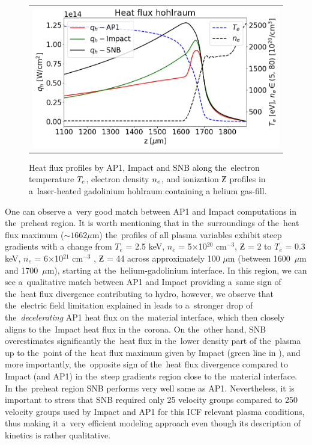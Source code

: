 \begin{figure}[htb]
  \begin{center}
    \begin{tabular}{c}
      \includegraphics[width=\figscale\textwidth]{../VFPdata/C7_GdHohlraum_heatflux.png}
    \end{tabular}
  \caption{
  Heat flux profiles by AP1, Impact and SNB along 
  the~electron temperature $T_e$, electron density $n_e$, 
  and ionization $\Zbar$ profiles in a~laser-heated gadolinium hohlraum 
  containing a helium gas-fill.
  }
  \label{fig:Gd_VFP_10ps_heatflux}
  \end{center} 
\end{figure}

One can observe a~very good
match between AP1 and Impact computations in the~preheat region.
It is worth mentioning that in the~surroundings of the~heat flux maximum 
($\sim 1662 \mu$m) the~profiles of all plasma variables exhibit steep gradients 
with a change from $T_e$ = 2.5 keV, $n_e$ = 5$\times$10$^{20}$ cm$^{−3}$, 
$\Zbar$ = 2 to $T_e$ = 0.3 keV, $n_e$ = 6$\times$10$^{21}$ cm$^{−3}$ , 
$\Zbar$ = 44 across approximately 100 $\mu$m 
(between 1600~$\mu$m and 1700~$\mu$m), starting at the~helium-gadolinium 
interface.  
In this region, we can see a~qualitative match between AP1 and Impact providing
a~same sign of the~heat flux divergence contributing to hydro, however,
we observe that the~electric field limitation explained in 
 leads to a~stronger drop of 
the~\textit{decelerating} AP1 heat flux on the~material 
interface, which then closely aligns to the~Impact heat flux in the~corona. 
On the~other hand, 
SNB overestimates significantly the~heat flux in the~lower density part 
of the~plasma up to the~point of the~heat flux maximum given by Impact 
(green line in ), and more 
importantly, the~opposite sign of the~heat flux divergence compared to Impact
(and AP1) in the~steep gradients region close to the~material interface. 
In the~preheat region SNB performs 
very well same as AP1. Nevertheless, it is important to stress that 
SNB required only 25 velocity groups compared to 250 velocity groups used by
Impact and AP1 for this ICF relevant plasma conditions, thus making it a~very
efficient modeling approach even though its description of kinetics is rather
qualitative.

%
